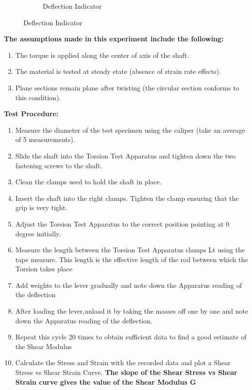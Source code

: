 \documentclass[12pt,a4paper]{article}	%
\begin{document}
\begin{figure}[h!]
\begin{subfigure}[b]{8.5cm}
	\caption{Deflection Indicator}
\end{subfigure}
\end{figure}


\break

\textbf{The assumptions made in this experiment include the following:}
\begin{enumerate}
\item The torque is applied along the center of axis of the shaft. 
\item The material is tested at steady state (absence of strain rate effects). 
\item Plane sections remain plane after twisting (the circular section conforms to this condition). \\
\end{enumerate}

\textbf{Test Procedure:}
\begin{enumerate}
\item Measure the diameter of the test specimen using the caliper (take an average of 5 measurements). 
\item Slide the shaft into the Torsion Test Apparatus and tighten down the two fastening screws to the shaft.  
\item Clean the clamps used to hold the shaft in place. \item Insert the shaft into the right clamps. Tighten the clamp ensuring that the grip is very tight.
\item Adjust the Torsion Test Apparatus to the correct position pointing at 0 degree initially. 
\item Measure the length between the Torsion Test Apparatus clamps Lt using the tape measure. This length is the effective length of the rod between which the Torsion takes place 
\item Add weights to the lever gradually and note down the Apparatus reading of the deflection
\item After loading the lever,unload it by taking the masses off one by one and note down the Apparatus reading of the deflection.
\item Repeat this cycle 20 times to obtain sufficient data to  find a good estimate of the Shear Modulus\\
\item Calculate the Stress and Strain with the recorded data and plot a Shear Stress vs Shear Strain Curve.
\textbf{The slope of the Shear Stress vs Shear Strain curve gives the value of the Shear Modulus G}\\
\end{enumerate}
\thispagestyle{empty}	%
\end{document}
